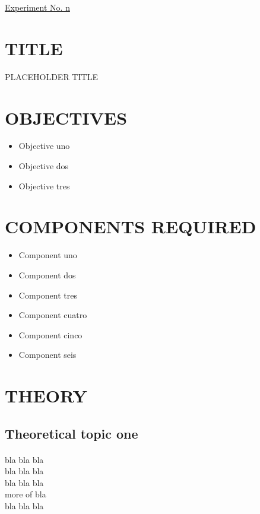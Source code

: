 \documentclass[11pt,a4paper]{article}
\begin{document}
\begin{centering}{\underline{\Large{Experiment No. n}}}\\
\end{centering}

\section*{TITLE}
{\large PLACEHOLDER TITLE}

\section*{OBJECTIVES}

\begin{itemize}
	\item Objective uno
	\item Objective dos
	\item Objective tres
\end{itemize}

\section*{COMPONENTS REQUIRED}

\begin{itemize}
	\item Component uno
	\item Component dos
	\item Component tres
	\item Component cuatro
	\item Component cinco
	\item Component seis
\end{itemize}

\section*{THEORY}

\subsection*{Theoretical topic one}

\paragraph{}
bla bla bla\\
bla bla bla\\
bla bla bla\\
more of bla\\
bla bla bla\\
\end{document}

